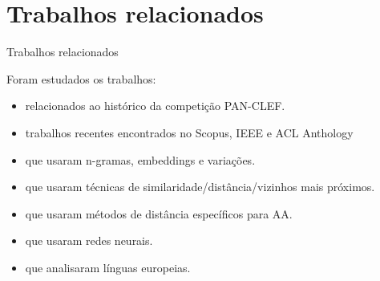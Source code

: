 \section{Trabalhos relacionados}

\begin{frame}{Trabalhos relacionados}

Foram estudados os trabalhos:
\begin{itemize}
	\item relacionados ao histórico da competição PAN-CLEF.
	\item trabalhos recentes encontrados no Scopus, IEEE e ACL Anthology
	\item que usaram n-gramas, embeddings e variações.
	\item que usaram técnicas de similaridade/distância/vizinhos mais próximos.
	\item que usaram métodos de distância específicos para AA.
	\item que usaram redes neurais.
	\item que analisaram línguas europeias.
\end{itemize}

\end{frame}

